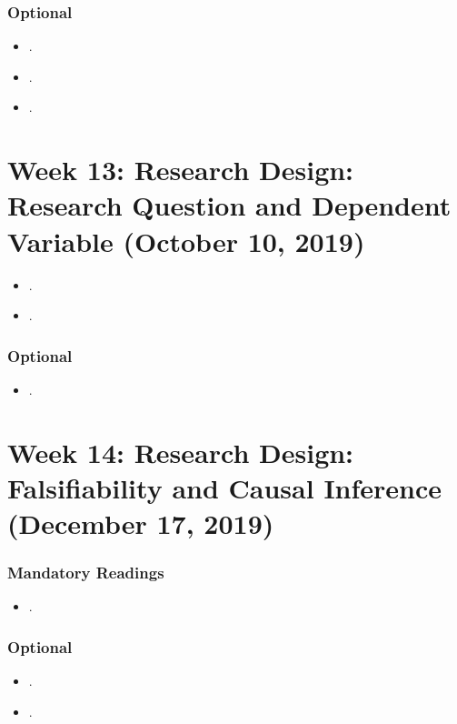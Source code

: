\documentclass[abstract=on,parskip=full,headings=standardclasses,fontsize=11pt,paper=a4]{scrartcl}
\begin{document}
\subsubsection*{Optional}
\begin{itemize}
\item {}.
\item {}.
\item {}.
\end{itemize}


\section{Week 13:  Research Design: Research Question and Dependent Variable  (October 10, 2019)}

\begin{itemize}
\renewcommand\labelitemi{--}
\item {}.
\item {}.
\end{itemize}

\subsubsection*{Optional}
\begin{itemize}
\item {}.
\end{itemize}

\section{Week 14: Research Design: Falsifiability and Causal Inference (December 17, 2019)}


\subsubsection*{Mandatory Readings}
\begin{itemize}
\item {}.
\end{itemize}


\subsubsection*{Optional}
\begin{itemize}
\item {}.
\item {}.
\end{itemize}
\end{document}
